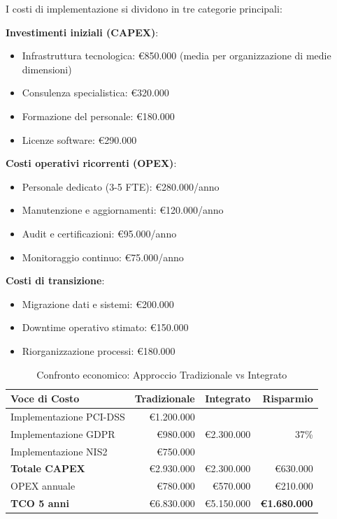 I costi di implementazione si dividono in tre categorie principali:

\textbf{Investimenti iniziali (CAPEX)}:
\begin{itemize}
    \item Infrastruttura tecnologica: €850.000 (media per organizzazione di medie dimensioni)
    \item Consulenza specialistica: €320.000
    \item Formazione del personale: €180.000
    \item Licenze software: €290.000
\end{itemize}

\textbf{Costi operativi ricorrenti (OPEX)}:
\begin{itemize}
    \item Personale dedicato (3-5 FTE): €280.000/anno
    \item Manutenzione e aggiornamenti: €120.000/anno
    \item Audit e certificazioni: €95.000/anno
    \item Monitoraggio continuo: €75.000/anno
\end{itemize}

\textbf{Costi di transizione}:
\begin{itemize}
    \item Migrazione dati e sistemi: €200.000
    \item Downtime operativo stimato: €150.000
    \item Riorganizzazione processi: €180.000
\end{itemize}

\begin{table}[h]
\centering
\caption[Confronto economico: Tradizionale vs Integrato]{Confronto economico: Approccio Tradizionale vs Integrato}
\label{tab:confronto_economico}
\small
\begin{tabularx}{\textwidth}{|X|r|r|r|}
\hline
\textbf{Voce di Costo} & \textbf{Tradizionale} & \textbf{Integrato} & \textbf{Risparmio} \\
\hline
Implementazione PCI-DSS & €1.200.000 & \multirow{3}{*}{€2.300.000} & \multirow{3}{*}{37\%} \\
Implementazione GDPR & €980.000 & & \\
Implementazione NIS2 & €750.000 & & \\
\hline
\textbf{Totale CAPEX} & €2.930.000 & €2.300.000 & €630.000 \\
\hline
OPEX annuale & €780.000 & €570.000 & €210.000 \\
\hline
\textbf{TCO 5 anni} & €6.830.000 & €5.150.000 & \textbf{€1.680.000} \\
\hline
\end{tabularx}
\end{table}

